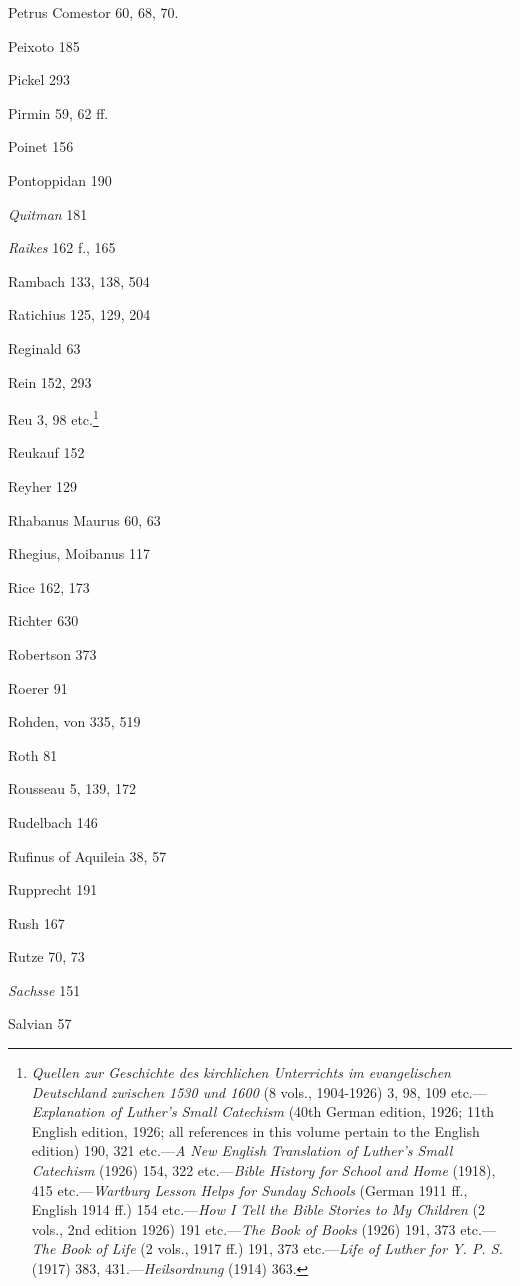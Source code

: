 Petrus Comestor 60, 68, 70.

Peixoto 185

Pickel 293

Pirmin 59, 62 ff.

Poinet 156

Pontoppidan 190

\emph{Quitman} 181

\emph{Raikes} 162 f., 165

Rambach 133, 138, 504

Ratichius 125, 129, 204

Reginald 63

Rein 152, 293

Reu 3, 98 etc.\footnote{\emph{Quellen zur Geschichte des kirchlichen Unterrichts im evangelischen Deutschland zwischen 1530 und 1600} (8 vols., 1904-1926) 3, 98, 109 etc.—\emph{Explanation of Luther’s Small Catechism} (40th German edition, 1926; 11th English edition, 1926; all references in this volume pertain to the English edition) 190, 321 etc.—\emph{A New English Translation of Luther’s Small Catechism} (1926) 154, 322 etc.—\emph{Bible History for School and Home} (1918), 415 etc.—\emph{Wartburg Lesson Helps for Sunday Schools} (German 1911 ff., English 1914 ff.) 154 etc.—\emph{How I Tell the Bible Stories to My Children} (2 vols., 2nd edition 1926) 191 etc.—\emph{The Book of Books} (1926) 191, 373 etc.—\emph{The Book of Life} (2 vols., 1917 ff.) 191, 373 etc.—\emph{Life of Luther for Y. P. S.} (1917) 383, 431.—\emph{Heilsordnung} (1914) 363.}

Reukauf 152

Reyher 129

Rhabanus Maurus 60, 63

Rhegius, Moibanus 117

Rice 162, 173

Richter 630

Robertson 373

Roerer 91

Rohden, von 335, 519

Roth 81

Rousseau 5, 139, 172

Rudelbach 146

Rufinus of Aquileia 38, 57

Rupprecht 191

Rush 167

Rutze 70, 73

\emph{Sachsse} 151

Salvian 57

